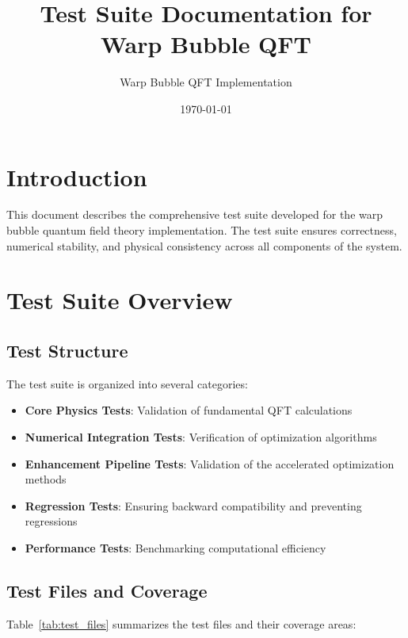 \documentclass[12pt]{article}
\title{Test Suite Documentation for Warp Bubble QFT}
\author{Warp Bubble QFT Implementation}
\date{\today}
\begin{document}
\maketitle

\section{Introduction}

This document describes the comprehensive test suite developed for the warp bubble quantum field theory implementation. The test suite ensures correctness, numerical stability, and physical consistency across all components of the system.

\section{Test Suite Overview}

\subsection{Test Structure}

The test suite is organized into several categories:

\begin{itemize}
\item \textbf{Core Physics Tests}: Validation of fundamental QFT calculations
\item \textbf{Numerical Integration Tests}: Verification of optimization algorithms
\item \textbf{Enhancement Pipeline Tests}: Validation of the accelerated optimization methods
\item \textbf{Regression Tests}: Ensuring backward compatibility and preventing regressions
\item \textbf{Performance Tests}: Benchmarking computational efficiency
\end{itemize}

\subsection{Test Files and Coverage}

Table~\ref{tab:test_files} summarizes the test files and their coverage areas:
\end{document}
